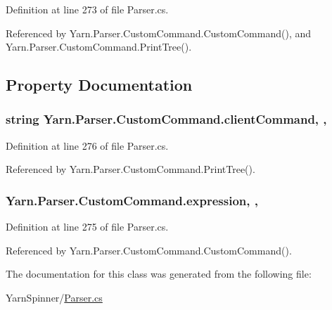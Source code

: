 Definition at line 273 of file Parser.\-cs.



Referenced by Yarn.\-Parser.\-Custom\-Command.\-Custom\-Command(), and Yarn.\-Parser.\-Custom\-Command.\-Print\-Tree().



\subsection{Property Documentation}
\hypertarget{a00085_a1a362244273df822233359d8fe4e9f5d}{
\subsubsection[{client\-Command}]{\setlength{\rightskip}{0pt plus 5cm}string Yarn.\-Parser.\-Custom\-Command.\-client\-Command\hspace{0.3cm}{\ttfamily [get]}, {\ttfamily [set]}, {\ttfamily [package]}}}\label{a00085_a1a362244273df822233359d8fe4e9f5d}


Definition at line 276 of file Parser.\-cs.



Referenced by Yarn.\-Parser.\-Custom\-Command.\-Print\-Tree().

\hypertarget{a00085_a4250d192d5b58e2404a14c68eb616f16}{
\subsubsection[{expression}]{ Yarn.\-Parser.\-Custom\-Command.\-expression\hspace{0.3cm}{\ttfamily [get]}, {\ttfamily [set]}, {\ttfamily [package]}}}\label{a00085_a4250d192d5b58e2404a14c68eb616f16}


Definition at line 275 of file Parser.\-cs.



Referenced by Yarn.\-Parser.\-Custom\-Command.\-Custom\-Command().



The documentation for this class was generated from the following file\-:\begin{DoxyCompactItemize}
\item 
Yarn\-Spinner/\hyperlink{a00316}{Parser.\-cs}\end{DoxyCompactItemize}
